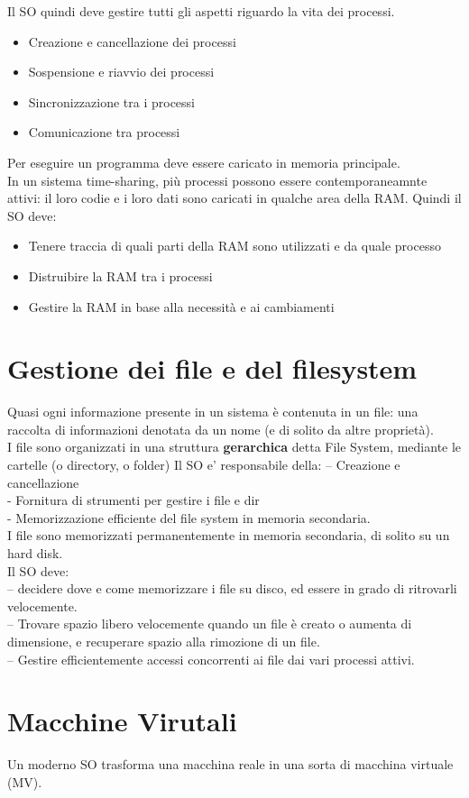 Il SO quindi deve gestire tutti gli aspetti riguardo la vita dei processi.\\
\begin{itemize}
    \item Creazione e cancellazione dei processi
    \item Sospensione e riavvio dei processi
    \item Sincronizzazione tra i processi
    \item Comunicazione tra processi
\end{itemize}
Per eseguire un programma deve essere caricato in memoria principale.\\
In un sistema time-sharing, più processi possono essere contemporaneamnte attivi: il loro codie e i loro dati sono caricati in qualche area della RAM. Quindi il SO deve:
\begin{itemize}
    \item Tenere traccia di quali parti della RAM sono utilizzati e da quale processo
    \item Distruibire la RAM tra i processi
    \item Gestire la RAM in base alla necessità e ai cambiamenti
\end{itemize}

\section{Gestione dei file e del filesystem}
Quasi ogni informazione presente in un sistema è contenuta in un file: una raccolta di informazioni denotata da un nome (e di solito da altre proprietà).\\

I file sono organizzati in una struttura \textbf{gerarchica} detta File System, mediante le cartelle (o directory, o folder)
Il SO e’ responsabile della:
– Creazione e cancellazione\\
- Fornitura di strumenti per gestire i file e dir\\
- Memorizzazione efficiente del file system in memoria secondaria.\\

I file sono memorizzati permanentemente in memoria secondaria, di solito su un hard disk.\\
Il SO deve:\\
  – decidere dove e come memorizzare i file su disco, ed essere in grado di ritrovarli velocemente.\\
  – Trovare spazio libero velocemente quando un file è creato o aumenta di dimensione, e recuperare spazio alla rimozione di un file.\\
  – Gestire efficientemente accessi concorrenti ai file dai vari processi attivi.\\

\section{Macchine Virutali}
Un moderno SO trasforma una macchina reale in una sorta di macchina virtuale (MV).
